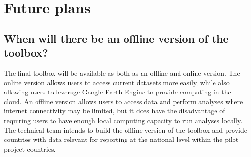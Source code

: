\documentclass[letterpaper,10pt,english]{sphinxmanual}
\begin{document}
\section{Future plans}
\label{\detokenize{Introduction/faq:future-plans}}

\subsection{When will there be an offline version of the toolbox?}
\label{\detokenize{Introduction/faq:when-will-there-be-an-offline-version-of-the-toolbox}}
\sphinxAtStartPar
The final toolbox will be available as both as an offline and online version.
The online version allows users to access current datasets more easily, while
also allowing users to leverage Google Earth Engine to provide computing in the
cloud. An offline version allows users to access data and perform analyses
where internet connectivity may be limited, but it does have the disadvantage
of requiring users to have enough local computing capacity to run analyses
locally. The technical team intends to build the offline version of the toolbox
and provide countries with data relevant for reporting at the national level
within the pilot project countries.

\sphinxstepscope
\end{document}

